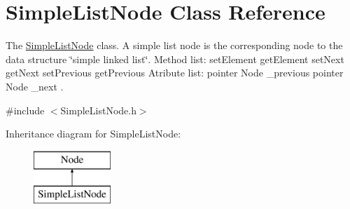 \hypertarget{classSimpleListNode}{\section{Simple\-List\-Node Class Reference}
\label{classSimpleListNode}
}


The \hyperlink{classSimpleListNode}{Simple\-List\-Node} class. A simple list node is the corresponding node to the data structure \char`\"{}simple linked list\char`\"{}. Method list\-:   set\-Element  get\-Element  set\-Next  get\-Next  set\-Previous  get\-Previous  Atribute list\-:   pointer Node \-\_\-previous  pointer Node \-\_\-next .  




{\ttfamily \#include $<$Simple\-List\-Node.\-h$>$}

Inheritance diagram for Simple\-List\-Node\-:\begin{figure}[H]
\begin{center}
\leavevmode
\includegraphics[height=2.000000cm]{classSimpleListNode}
\end{center}
\end{figure}
